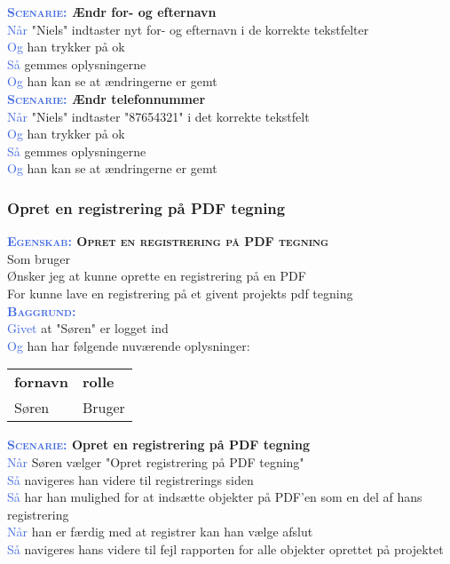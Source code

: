 \textbf{\textsc{\textcolor{RoyalBlue}{Scenarie:}} Ændr for- og efternavn}\\
\textcolor{RoyalBlue}{Når} "Niels" indtaster nyt for- og efternavn i de korrekte tekstfelter\\
\textcolor{RoyalBlue}{Og} han trykker på ok\\
\textcolor{RoyalBlue}{Så} gemmes oplysningerne\\
\textcolor{RoyalBlue}{Og} han kan se at ændringerne er gemt\\

\textbf{\textsc{\textcolor{RoyalBlue}{Scenarie:}} Ændr telefonnummer}\\
\textcolor{RoyalBlue}{Når} "Niels" indtaster "87654321" i det korrekte tekstfelt\\
\textcolor{RoyalBlue}{Og} han trykker på ok\\
\textcolor{RoyalBlue}{Så} gemmes oplysningerne\\
\textcolor{RoyalBlue}{Og} han kan se at ændringerne er gemt\\

\subsubsection{Opret en registrering på PDF tegning} %
\textbf{\textsc{\textcolor{RoyalBlue}{Egenskab:} Opret en registrering på PDF tegning}}\\
Som bruger\\
Ønsker jeg at kunne oprette en registrering på en PDF\\
For kunne lave en registrering på et givent projekts pdf tegning\\

\textsc{\textcolor{RoyalBlue}{\textbf{Baggrund:}}}\\
\textcolor{RoyalBlue}{Givet} at "Søren" er logget ind\\
\textcolor{RoyalBlue}{Og} han har følgende nuværende oplysninger:\\
\begin{tabular}{| l | l |}
	\textbf{fornavn} & \textbf{rolle} \\
	Søren & Bruger\\
\end{tabular}

\textbf{\textsc{\textcolor{RoyalBlue}{Scenarie:}} Opret en registrering på PDF tegning}\\
\textcolor{RoyalBlue}{Når} Søren vælger "Opret registrering på PDF tegning"\\
\textcolor{RoyalBlue}{Så}  navigeres han videre til registrerings siden\\
\textcolor{RoyalBlue}{Så}  har han mulighed for at indsætte objekter på PDF'en som en del af hans registrering\\
\textcolor{RoyalBlue}{Når} han er færdig med at registrer kan han vælge afslut \\
\textcolor{RoyalBlue}{Så}  navigeres hans videre til fejl rapporten for alle objekter oprettet på projektet \\ 

